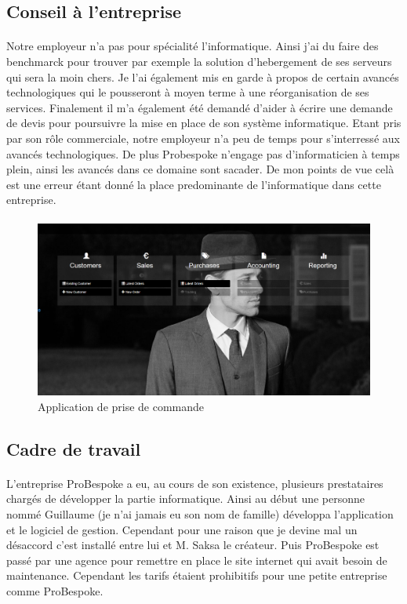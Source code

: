  \subsection{Conseil à l'entreprise}
 \paragraph{}
 Notre employeur n'a pas pour spécialité l'informatique. Ainsi j'ai du faire des benchmarck pour trouver par exemple la solution d'hebergement de ses serveurs qui sera la moin chers. Je l'ai également mis en garde à propos de certain avancés technologiques qui le pousseront à moyen terme à une réorganisation de ses services. Finalement il m'a également été demandé d'aider à écrire une demande de devis pour poursuivre la mise en place de son système informatique. Etant pris par son rôle commerciale, notre employeur n'a peu de temps pour s'interressé aux avancés technologiques. De plus Probespoke n'engage pas d'informaticien à temps plein, ainsi les avancés dans ce domaine sont sacader. De mon points de vue celà est une erreur étant donné la place predominante de l'informatique dans cette entreprise.
 \paragraph{}
 \begin{figure}[!h]
 \centering
 \includegraphics[width=16cm]{image/prise.png}
 \caption{Application de prise de commande}
 \end{figure}

  \subsection{Cadre de travail}
  \paragraph{}
L'entreprise ProBespoke a eu, au cours de son existence, plusieurs prestataires chargés de développer la partie informatique. Ainsi au début une personne nommé Guillaume (je n'ai jamais eu son nom de famille) développa l'application et le logiciel de gestion. Cependant pour une raison que je devine mal un désaccord c'est installé entre lui et M. Saksa le créateur. Puis ProBespoke est passé par une agence pour remettre en place le site internet qui avait besoin de maintenance. Cependant les tarifs étaient prohibitifs pour une petite entreprise comme ProBespoke.
